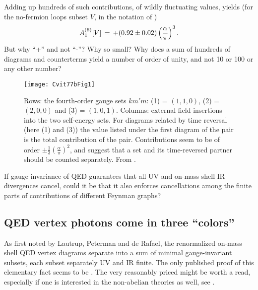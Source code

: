 Adding up hundreds of such contributions, of wildly fluctuating values,
yields (for the no-fermion loops subset $V$, in the notation of
)
\[
 A_1^{(6)}[V]\,=\, +  (0.92 \pm 0.02) \left(\frac{\alpha}{\pi}\right)^3.
\]
But why ``+'' and not ``-''? Why so small? Why does a sum of hundreds of
diagrams and counterterms yield a number of order of unity, and not 10 or
100 or any other number?

\begin{figure}
\begin{center}
\texttt{[image: Cvit77bFig1]}
\end{center}
\caption{\label{Cvit77bFig1}
Rows: the fourth-order gauge sets
$km'm$: (1) = $(1,1,0)$,
(2) = $(2,0,0)$
and
(3) = $(1,0,1)$.
Columns: external field insertions into the two self-energy sets.
For diagrams related by time
reversal (here (1) and (3))
the value listed under the first diagram of the pair is
the total contribution of the pair. Contributions seem to be of order
$\pm\frac{1}{3}\left(\frac{\alpha}{\pi}\right)^2$, and suggest that
a set and its time-reversed partner should be counted separately.
From .
}
 \end{figure}

If gauge invariance of QED guarantees that all UV and on-mass shell IR
divergences cancel, could it be that it also enforces cancellations among
the finite parts of contributions of different Feynman graphs?

\subsection{QED vertex photons come in three ``colors''}
\label{sect:gaugeSetDeriv}

As first noted by Lautrup, Peterman and de Rafael, the
renormalized on-mass shell QED vertex diagrams separate into a sum of
minimal gauge-invariant subsets, each subset separately UV and IR finite.
The only published proof of this elementary fact seems to be
. The very reasonably priced  might be
worth a read, especially if one is interested in the non-abelian
theories as well,
see .


